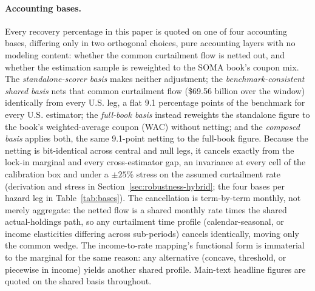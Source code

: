 \documentclass[12pt]{article}
\begin{document}
\paragraph{Accounting bases.} Every recovery percentage in this paper is quoted on one of four accounting bases, differing only in two orthogonal choices, pure accounting layers with no modeling content: whether the common curtailment flow is netted out, and whether the estimation sample is reweighted to the SOMA book's coupon mix. The \emph{standalone-scorer basis} makes neither adjustment; the \emph{benchmark-consistent shared basis} nets that common curtailment flow (\$69.56 billion over the window) identically from every U.S. leg, a flat 9.1 percentage points of the benchmark for every U.S. estimator; the \emph{full-book basis} instead reweights the standalone figure to the book's weighted-average coupon (WAC) without netting; and the \emph{composed basis} applies both, the same 9.1-point netting to the full-book figure. Because the netting is bit-identical across central and null legs, it cancels exactly from the lock-in marginal and every cross-estimator gap, an invariance at every cell of the calibration box and under a $\pm 25\%$ stress on the assumed curtailment rate (derivation and stress in Section~\ref{sec:robustness-hybrid}; the four bases per hazard leg in Table~\ref{tab:bases}). The cancellation is term-by-term monthly, not merely aggregate: the netted flow is a shared monthly rate times the shared actual-holdings path, so any curtailment time profile (calendar-seasonal, or income elasticities differing across sub-periods) cancels identically, moving only the common wedge. The income-to-rate mapping's functional form is immaterial to the marginal for the same reason: any alternative (concave, threshold, or piecewise in income) yields another shared profile. Main-text headline figures are quoted on the shared basis throughout.
\end{document}
